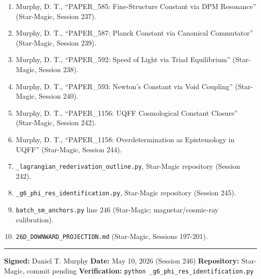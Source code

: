 \documentclass[
]{article}
\providecommand{\tightlist}{%
  \setlength{\itemsep}{0pt}\setlength{\parskip}{0pt}}
\begin{document}
\begin{enumerate}
\def\labelenumi{\arabic{enumi}.}
\tightlist
\item
  Murphy, D. T., ``PAPER\_585: Fine-Structure Constant via DPM
  Resonance'' (Star-Magic, Session 237).
\item
  Murphy, D. T., ``PAPER\_587: Planck Constant via Canonical
  Commutator'' (Star-Magic, Session 239).
\item
  Murphy, D. T., ``PAPER\_592: Speed of Light via Triad Equilibrium''
  (Star-Magic, Session 238).
\item
  Murphy, D. T., ``PAPER\_593: Newton's Constant via Void Coupling''
  (Star-Magic, Session 240).
\item
  Murphy, D. T., ``PAPER\_1156: UQFF Cosmological Constant Closure''
  (Star-Magic, Session 242).
\item
  Murphy, D. T., ``PAPER\_1158: Overdetermination as Epistemology in
  UQFF'' (Star-Magic, Session 244).
\item
  \texttt{\_lagrangian\_rederivation\_outline.py}, Star-Magic repository
  (Session 242).
\item
  \texttt{\_g6\_phi\_res\_identification.py}, Star-Magic repository
  (Session 245).
\item
  \texttt{batch\_sm\_anchors.py} line 246 (Star-Magic;
  magnetar/cosmic-ray calibration).
\item
  \texttt{26D\_DOWNWARD\_PROJECTION.md} (Star-Magic, Sessions 197-201).
\end{enumerate}

\begin{center}\rule{0.5\linewidth}{0.5pt}\end{center}

\textbf{Signed:} Daniel T. Murphy \textbf{Date:} May 10, 2026 (Session
246) \textbf{Repository:} Star-Magic, commit pending
\textbf{Verification:}
\texttt{python\ \_g6\_phi\_res\_identification.py}
\end{document}
